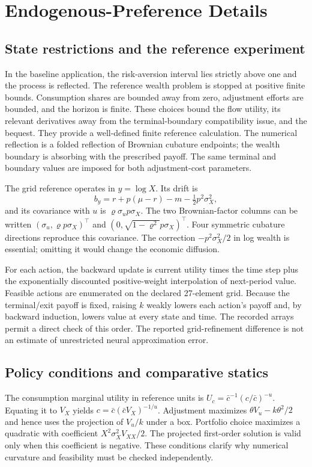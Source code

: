 \documentclass[ecta,draft]{econsocart}
\begin{document}
\section{Endogenous-Preference Details}
\subsection{State restrictions and the reference experiment}
In the baseline application, the risk-aversion interval lies strictly above one and the process is reflected. The reference wealth problem is stopped at positive finite bounds. Consumption shares are bounded away from zero, adjustment efforts are bounded, and the horizon is finite. These choices bound the flow utility, its relevant derivatives away from the terminal-boundary compatibility issue, and the bequest. They provide a well-defined finite reference calculation. The numerical reflection is a folded reflection of Brownian cubature endpoints; the wealth boundary is absorbing with the prescribed payoff. The same terminal and boundary values are imposed for both adjustment-cost parameters.

The grid reference operates in $y=\log X$. Its drift is
\[
 b_y=r+p(\mu-r)-m-\tfrac12p^2\sigma_X^2,
\]
and its covariance with $u$ is $\varrho\sigma_u p\sigma_X$. The two Brownian-factor columns can be written $(\sigma_u,\varrho p\sigma_X)^\top$ and $(0,\sqrt{1-\varrho^2}p\sigma_X)^\top$. Four symmetric cubature directions reproduce this covariance. The correction $-p^2\sigma_X^2/2$ in log wealth is essential; omitting it would change the economic diffusion.

For each action, the backward update is current utility times the time step plus the exponentially discounted positive-weight interpolation of next-period value. Feasible actions are enumerated on the declared 27-element grid. Because the terminal/exit payoff is fixed, raising $k$ weakly lowers each action's payoff and, by backward induction, lowers value at every state and time. The recorded arrays permit a direct check of this order. The reported grid-refinement difference is not an estimate of unrestricted neural approximation error.

\subsection{Policy conditions and comparative statics}
The consumption marginal utility in reference units is $U_c=\bar c^{-1}(c/\bar c)^{-u}$. Equating it to $V_X$ yields $c=\bar c(\bar cV_X)^{-1/u}$. Adjustment maximizes $\theta V_u-k\theta^2/2$ and hence uses the projection of $V_u/k$ under a box. Portfolio choice maximizes a quadratic with coefficient $X^2\sigma_X^2V_{XX}/2$. The projected first-order solution is valid only when this coefficient is negative. These conditions clarify why numerical curvature and feasibility must be checked independently.
\end{document}
